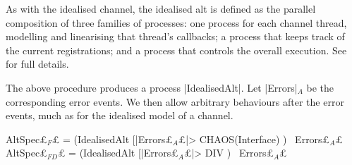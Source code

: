 As with the idealised channel, the idealised alt is defined as the parallel
composition of three families of processes: one process for each channel
thread, modelling and linearising that thread's callbacks; a process that
keeps track of the current registrations; and a process that controls the
overall execution.  See~\cite{TR} for  full details.

The above procedure produces a process |IdealisedAlt|.  Let |Errors|$_A$ be
the corresponding error events.  We then allow arbitrary behaviours after the
error events, much as for the idealised model of a channel.
%
\begin{cspm}
AltSpec£$_F$£ = (IdealisedAlt [|Errors£$_A$£|> CHAOS(Interface) ) \ Errors£$_A$£
AltSpec£$_{FD}$£ = (IdealisedAlt [|Errors£$_A$£|> DIV ) \ Errors£$_A$£
\end{cspm}



